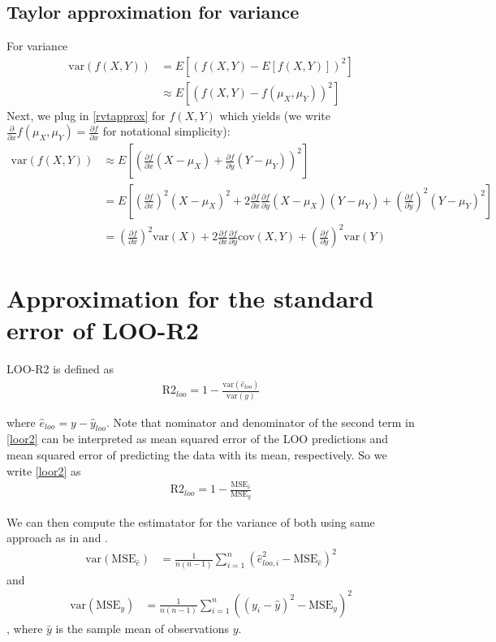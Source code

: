 \documentclass{article}
\begin{document}
\subsection{Taylor approximation for variance}
For variance
\begin{align}
    \text{var}(f(X, Y)) &= E\left[ \left(f(X, Y) - E[f(X,Y)] \right)^2 \right] \nonumber \\
    &\approx E\left[ \left( f(X, Y) - f(\mu_X, \mu_Y) \right)^2 \right] \nonumber
\end{align}
Next, we plug in \eqref{rvtapprox} for $f(X,Y)$ which yields (we write $\frac{\partial }{\partial x} f(\mu_X, \mu_Y) = \frac{\partial f}{\partial x}$ for notational simplicity):
\begin{align}
    \text{var}(f(X, Y)) &\approx E\left[ \left( \frac{\partial f}{\partial x} (X - \mu_X) + \frac{\partial f}{\partial y} (Y - \mu_Y) \right)^2 \right] \nonumber \\
    &= E\left[ \left( \frac{\partial f}{\partial x}  \right)^2 (X - \mu_X)^2 + 2 \frac{\partial f}{\partial x} \frac{\partial f}{\partial y} (X - \mu_X)(Y - \mu_Y) + \left( \frac{\partial f}{\partial y}  \right)^2 (Y - \mu_Y)^2  \right] \nonumber \\
    &= \left( \frac{\partial f}{\partial x}  \right)^2 \text{var}(X) + 2 \frac{\partial f}{\partial x} \frac{\partial f}{\partial y} \text{cov}(X, Y) + \left( \frac{\partial f}{\partial y}  \right)^2 \text{var}(Y) \label{varapprox}
\end{align}

\section{Approximation for the standard error of LOO-R2}
LOO-R2 is defined as
\begin{align}
\text{R2}_{loo} = 1 - \frac{\text{var}(\hat{e}_{loo}) }{ \text{var}(y)} \label{loor2}
\end{align}

where $\hat{e}_{loo} = y - \hat{y}_{loo}$. Note that nominator and denominator of the second term in \eqref{loor2} can be interpreted as mean squared error of the LOO predictions and mean squared error of predicting the data with its mean, respectively. So we write \eqref{loor2} as 
\begin{align}
    \text{R2}_{loo} = 1 - \frac{\text{MSE}_{\hat{e}} }{ \text{MSE}_y} \label{mser2}
\end{align}

We can then compute the estimatator for the variance of both using same approach as in \cite{sivula_uncertainty_2022} and \cite{vehtari_practical_2016}.
\begin{align}
    \text{var}(\text{MSE}_{\hat{e}}) &= \frac{1}{n (n-1)} \sum_{i = 1}^n \left( \hat{e}_{loo, i}^2 - \text{MSE}_{\hat{e}} \right)^2 \label{vare}
\end{align}
and
\begin{align}
    \text{var}(\text{MSE}_y) &= \frac{1}{n (n-1)} \sum_{i = 1}^n \left( (y_i - \hat{y})^2 -\text{MSE}_y \right)^2 \label{vary}
\end{align},
where $\bar{y}$ is the sample mean of observations $y$. 
\end{document}
